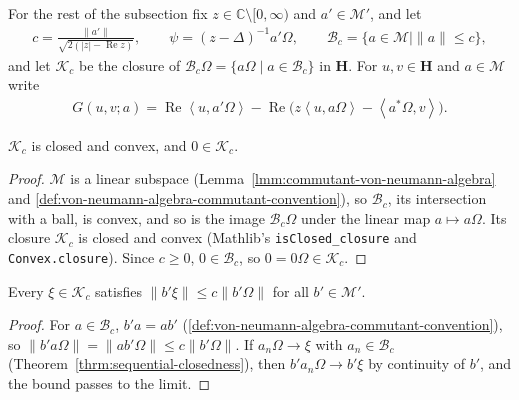 For the rest of the subsection fix $z \in \mathbb{C} \setminus [0, \infty)$ and $a' \in \mathcal{M}'$, and let
\begin{align}
    c = \frac{\|a'\|}{\sqrt{2(|z| - \operatorname{Re} z)}}, \qquad \psi = (z - \Delta)^{-1}a'\Omega, \qquad \mathcal{B}_c = \{ a \in \mathcal{M} \mid \|a\| \le c \},
\end{align}
and let $\mathcal{K}_c$ be the closure of $\mathcal{B}_c\Omega = \{ a\Omega \mid a \in \mathcal{B}_c \}$ in $\mathbf{H}$. For $u, v \in \mathbf{H}$ and $a \in \mathcal{M}$ write
\begin{align}
    G(u, v; a) = \operatorname{Re} \left< u, a'\Omega \right> - \operatorname{Re}\big( z\left< u, a\Omega \right> - \left< a^*\Omega, v \right> \big).
\end{align}

\begin{lemma}
    \label{lmm:takesaki-ball-closed-convex}
    \leanok
    $\mathcal{K}_c$ is closed and convex, and $0 \in \mathcal{K}_c$.
\end{lemma}
\begin{proof}
    \leanok
    $\mathcal{M}$ is a linear subspace (Lemma~\ref{lmm:commutant-von-neumann-algebra} and \ref{def:von-neumann-algebra-commutant-convention}), so $\mathcal{B}_c$, its intersection with a ball, is convex, and so is the image $\mathcal{B}_c\Omega$ under the linear map $a \mapsto a\Omega$. Its closure $\mathcal{K}_c$ is closed and convex (Mathlib's \texttt{isClosed\_closure} and \texttt{Convex.closure}). Since $c \ge 0$, $0 \in \mathcal{B}_c$, so $0 = 0\Omega \in \mathcal{K}_c$.
\end{proof}

\begin{lemma}
    \label{lmm:takesaki-ball-closure-bound}
    \leanok
    Every $\xi \in \mathcal{K}_c$ satisfies $\|b'\xi\| \le c\|b'\Omega\|$ for all $b' \in \mathcal{M}'$.
\end{lemma}
\begin{proof}
    \leanok
    For $a \in \mathcal{B}_c$, $b'a = ab'$ (\ref{def:von-neumann-algebra-commutant-convention}), so $\|b'a\Omega\| = \|ab'\Omega\| \le c\|b'\Omega\|$. If $a_n\Omega \to \xi$ with $a_n \in \mathcal{B}_c$ (Theorem~\ref{thrm:sequential-closedness}), then $b'a_n\Omega \to b'\xi$ by continuity of $b'$, and the bound passes to the limit.
\end{proof}

